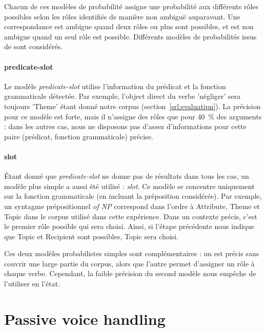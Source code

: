 Chacun de ces modèles de probabilité assigne une probabilité aux différents
rôles possibles selon les rôles identifiés de manière non ambiguë auparavant.
Une correspondance est ambigue quand deux rôles ou plus sont possibles, et est
non ambigue quand un seul rôle est possible. Différents modèles de probabilités
issus de \citep{swier2005exploiting} sont considérés.


\paragraph{predicate-slot}

Le modèle \emph{predicate-slot} utilise l'information du prédicat et la
fonction grammaticale détectée. Par exemple, l'object direct du verbe
'négliger' sera toujours 'Theme' étant donné notre corpus
(section~\ref{srl:evaluatipn}). La précision pour ce modèle est forte, mais il
n'assigne des rôles que pour 40~\% des arguments : dans les autres cas, nous ne
disposons pas d'assez d'informations pour cette paire (prédicat, fonction
grammaticale) précise.

\paragraph{slot}

Étant donné que \emph{predicate-slot} ne donne pas de résultats dans tous les
cas, un modèle plus simple a aussi été utilisé : \emph{slot}. Ce modèle se
concentre uniquement sur la fonction grammaticale (en incluant la préposition
considérée). Par exemple, un syntagme prépositionnel \emph{of NP} correspond
dans l'ordre à Attribute, Theme et Topic dans le corpus utilisé dans cette
expérience. Dans un contexte précis, c'est le premier rôle possible qui sera
choisi. Ainsi, si l'étape précédente nous indique que Topic et Recipient sont
possibles, Topic sera choisi.

Ces deux modèles probabilistes simples sont complémentaires : un est précis
sans couvrir une large partie du corpus, alors que l'autre permet d'assigner un
rôle à chaque verbe. Cependant, la faible précision du second modèle nous
empêche de l'utiliser en l'état. %

\section{Passive voice handling}

